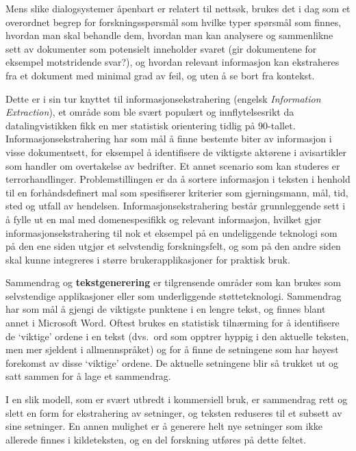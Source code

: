 \begin{multicols}{2}
Mens slike dialogsystemer åpenbart er relatert til nettsøk, brukes det i dag som et overordnet begrep for forskningsspørsmål som hvilke typer spørsmål som finnes, hvordan man skal behandle dem, hvordan man kan analysere og sammenlikne sett av dokumenter som potensielt inneholder svaret (gir dokumentene for eksempel motstridende svar?), og hvordan relevant informasjon kan ekstraheres fra et dokument med minimal grad av feil, og uten å se bort fra kontekst.

Dette er i sin tur knyttet til informasjonsekstrahering (engelsk \textit{Information Extraction}), et område som ble svært populært og innflytelsesrikt da datalingvistikken fikk en mer statistisk orientering tidlig på 90-tallet. Informasjonsekstrahering har som mål å finne bestemte biter av informasjon i visse dokumentsett,  for eksempel å identifisere de viktigste aktørene i avisartikler som handler om overtakelse av bedrifter. Et annet scenario som kan studeres er terrorhandlinger. Problemstillingen er da å sortere informasjon i teksten i henhold til en forhåndsdefinert mal som spesifiserer kriterier som gjerningsmann, mål, tid, sted og utfall av hendelsen. Informasjonsekstrahering består grunnleggende sett i å fylle ut en mal med domenespesifikk og relevant informasjon, hvilket gjør informasjonsekstrahering til nok et eksempel på en undeliggende teknologi som  på den ene siden utgjør et selvstendig forskningsfelt, og som på den andre siden skal kunne integreres i større brukerapplikasjoner for praktisk bruk.

Sammendrag og \textbf{tekstgenerering} er tilgrensende områder som kan brukes som selvstendige applikasjoner eller som underliggende støtteteknologi. Sammendrag har som mål å gjengi de viktigste punktene i en lengre tekst, og finnes blant annet i Microsoft Word. Oftest brukes en statistisk tilnærming for å identifisere de `viktige' ordene i en tekst (dvs.~ord som opptrer hyppig i den aktuelle teksten, men mer sjeldent i allmennspråket) og for å finne de setningene som har høyest forekomst av disse `viktige' ordene. De aktuelle setningene blir så trukket ut og satt sammen for å lage et sammendrag. 

I en slik modell, som er svært utbredt i kommersiell bruk, er sammendrag rett og slett en form for ekstrahering av setninger, og teksten reduseres til et subsett av sine setninger. En annen mulighet er å generere helt nye setninger som ikke allerede finnes i kildeteksten, og en del forskning utføres på dette feltet.



\end{multicols}
